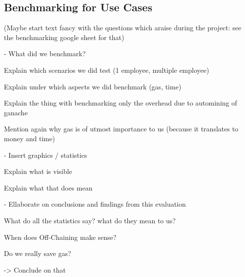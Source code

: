 \subsection{Benchmarking for Use Cases}

(Maybe start text fancy with the questions which araise during the project: see the benchmarking google sheet for that)

- What did we benchmark?

Explain which scenarios we did test (1 employee, multiple employee)

Explain under which aspects we did benchmark (gas, time)

Explain the thing with benchmarking only the overhead due to automining of ganache

Mention again why gas is of utmost importance to us (because it translates to money and time)

- Insert graphics / statistics

Explain what is visible

Explain what that does mean

- Ellaborate on conclusions and findings from this evaluation

What do all the statistics say? what do they mean to us?

When does Off-Chaining make sense?

Do we really save gas?

-> Conclude on that
